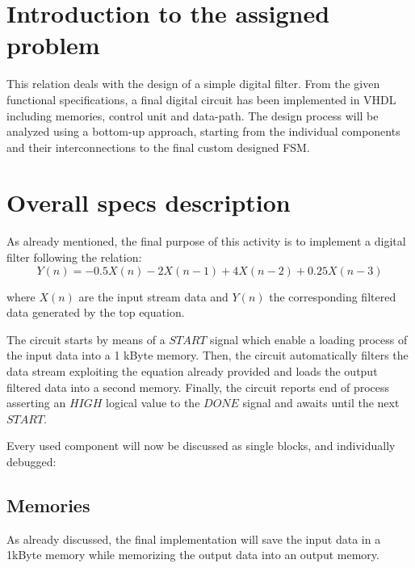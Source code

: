 \documentclass[12pt]{article}
\begin{document}
\newpage

\section*{Introduction to the assigned problem}
This relation deals with the design of a simple digital filter. From the given functional specifications, a final digital circuit has been implemented in VHDL including memories, control unit and data-path. 
\newline The design process will be analyzed using  a bottom-up approach, starting from the individual components and their interconnections to the final custom designed FSM.





\section*{Overall specs description}

As already mentioned, the final  purpose of this activity is to implement a digital filter following the relation:
\[Y(n) = -0.5X(n) - 2X(n-1) + 4X(n-2) + 0.25X(n-3) \]

where $ X(n) $ are the input stream data and $ Y(n) $ the corresponding filtered data generated by the top equation.

The circuit starts by means of a $START$ signal which enable a loading process of the input data into a 1 kByte memory. Then, the circuit automatically filters the data stream exploiting the equation already provided and loads the output filtered data into a second memory. Finally, the circuit reports end of process asserting an $HIGH$ logical value to the $DONE$ signal and awaits until the next $START$.

Every used component will now be discussed as single blocks, and individually debugged:
\newpage
\subsection*{Memories}

As already discussed, the final implementation will save the input data in a 1kByte memory while memorizing the output data into an output memory. 
\end{document}
